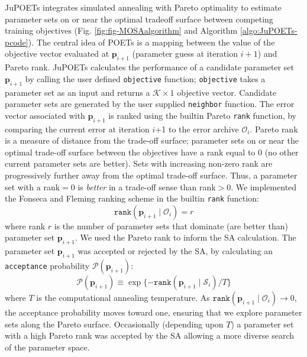 \documentclass{bmcart}
\begin{document}
JuPOETs integrates simulated annealing with Pareto optimality to estimate parameter sets on or near the optimal tradeoff surface between competing training objectives
(Fig. \ref{fig:fig-MOSAalgorithm} and Algorithm \ref{algo:JuPOETs-pcode}).
The central idea of POETs is a mapping between the value of the objective vector evaluated at $\mathbf{p}_{i+1}$ (parameter guess at iteration $i+1$) and Pareto rank.
JuPOETs calculates the performance of a candidate parameter set $\mathbf{p}_{i+1}$ by calling the user defined \texttt{objective} function; \texttt{objective} takes
a parameter set as an input and returns a $\mathcal{K}\times{1}$ objective vector. Candidate parameter sets are generated by the user supplied \texttt{neighbor} function.
The error vector associated with $\mathbf{p}_{i+1}$ is ranked using the builtin Pareto \texttt{rank} function, by comparing the current error at iteration $i$+1 to the error archive $\mathcal{O}_{i}$. Pareto rank is a measure of distance from the trade-off surface;
parameter sets on or near the optimal trade-off surface between the objectives have a rank equal to $0$ (no other current parameter sets are better).
Sets with increasing non-zero rank are progressively further away from the optimal trade-off surface.
Thus, a parameter set with a rank$=0$ is \emph{better} in a trade-off sense than rank$>0$.
We implemented the Fonseca and Fleming ranking scheme \cite{RANKING} in the builtin \texttt{rank} function:
\begin{equation}\label{eqn_rank}
\texttt{rank}\left(\mathbf{p}_{i+1}\mid \mathcal{O}_{i}\right)=r
\end{equation} where rank $r$ is the number of parameter sets that dominate (are better than) parameter set $\mathbf{p}_{i+1}$.
We used the Pareto rank to inform the SA calculation.
The parameter set $\mathbf{p}_{i+1}$ was accepted or rejected by the SA, by calculating an \texttt{acceptance} probability $\mathcal{P}\left(\mathbf{p}_{i+1}\right)$:
\begin{equation}\label{eqn_costMOSA}
\mathcal{P}(\mathbf{p}_{i+1}) \equiv \exp{\{-\texttt{rank}\left(\mathbf{p}_{i+1} \mid \mathcal{S}_{i} \right)/T\}}
\end{equation}
where $T$ is the computational annealing temperature.
As $\texttt{rank}\left(\mathbf{p}_{i+1}\mid \mathcal{O}_{i}\right)\rightarrow{0}$, the acceptance probability moves toward one,
ensuring that we explore parameter sets along the Pareto surface.
Occasionally (depending upon $T$) a parameter set with a high Pareto rank was accepted by the SA allowing a more diverse search of the parameter space.
\end{document}

